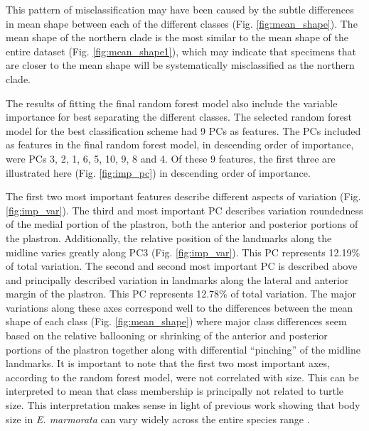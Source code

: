 \documentclass[12pt,letterpaper]{article}\usepackage{graphicx, color}
\begin{document}
This pattern of misclassification may have been caused by the subtle differences in mean shape between each of the different classes (Fig. \ref{fig:mean_shape}). The mean shape of the northern clade is the most similar to the mean shape of the entire dataset (Fig. \ref{fig:mean_shape1}), which may indicate that specimens that are closer to the mean shape will be systematically misclassified as the northern clade.



The results of fitting the final random forest model also include the variable importance for best separating the different classes. The selected random forest model for the best classification scheme had 9 PCs as features. The PCs included as features in the final random forest model, in descending order of importance, were PCs 3, 2, 1, 6, 5, 10, 9, 8 and 4. Of these 9 features, the first three are illustrated here (Fig. \ref{fig:imp_pc}) in descending order of importance. 

The first two most important features describe different aspects of variation (Fig. \ref{fig:imp_var}). The third and most important PC describes variation roundedness of the medial portion of the plastron, both the anterior and posterior portions of the plastron. Additionally, the relative position of the landmarks along the midline varies greatly along PC3 (Fig. \ref{fig:imp_var}). This PC represents 12.19\% of total variation. The second and second most important PC is described above and principally described variation in landmarks along the lateral and anterior margin of the plastron. This PC represents 12.78\% of total variation. The major variations along these axes correspond well to the differences between the mean shape of each class (Fig. \ref{fig:mean_shape}) where major class differences seem based on the relative ballooning or shrinking of the anterior and posterior portions of the plastron together along with differential ``pinching'' of the midline landmarks. It is important to note that the first two most important axes, according to the random forest model, were not correlated with size. This can be interpreted to mean that class membership is principally not related to turtle size. This interpretation makes sense in light of previous work showing that body size in \textit{E. marmorata} can vary widely across the entire species range \citep{Holland1992,Lubcke2007,Germano2009}.
\end{document}
